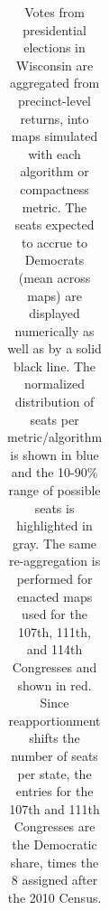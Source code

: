 \begin{table}
\begin{tabular}{l rm{7em} rm{7em} rm{7em} rm{7em}}
\hline \hline
\end{tabular}
\caption{Votes from presidential elections in Wisconsin are aggregated from precinct-level returns, into maps simulated with each algorithm or compactness metric. 
             The seats expected to accrue to Democrats (mean across maps) are displayed numerically as well as by a solid black line.
             The normalized distribution of seats per metric/algorithm is shown in blue and the 10-90\% range of possible seats is highlighted in gray.
             The same re-aggregation is performed for enacted maps used for the 107th, 111th, and 114th Congresses and shown in red.
             Since reapportionment shifts the number of seats per state,
               the entries for the 107th and 111th Congresses are the Democratic share,
               times the 8 assigned after the 2010 Census.
             }\label{tab:WI_seats}
\end{table}
 